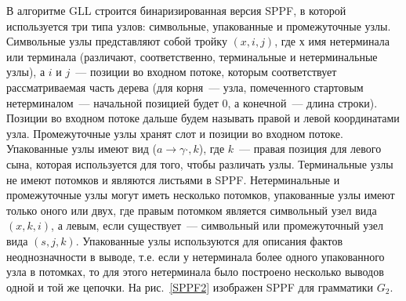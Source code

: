 В алгоритме GLL строится бинаризированная версия SPPF, в которой используется три типа узлов: символьные, упакованные и промежуточные узлы. Символьные узлы представляют собой тройку $(x, i , j)$, где $х$ имя нетерминала или терминала (различают, соответственно, терминальные и нетерминальные узлы), а $i$ и $j$~--- позиции во входном потоке, которым соответствует рассматриваемая часть дерева (для корня~--- узла, помеченного стартовым нетерминалом~--- начальной позицией будет 0, а конечной~--- длина строки). Позиции во входном потоке дальше будем называть правой и левой координатами узла. Промежуточные узлы хранят слот и позиции во входном потоке. Упакованные узлы имеют вид ($ a \rightarrow \gamma \cdot, k$), где $k$~--- правая позиция для левого сына, которая используется для того, чтобы различать узлы. Терминальные узлы не имеют потомков и являются листьями в SPPF. Нетерминальные и промежуточные узлы могут иметь несколько потомков, упакованные узлы имеют только оного или двух, где правым потомком является символьный узел вида $(x, k, i)$, а левым, если существует~--- символьный или промежуточный узел вида $(s, j, k)$. Упакованные узлы используются для описания фактов неоднозначности в выводе, т.е. если у нетерминала более одного упакованного узла в потомках, то для этого нетерминала было построено несколько выводов одной и той же цепочки. На рис.~\ref{SPPF2} изображен SPPF для грамматики $G_2$.

